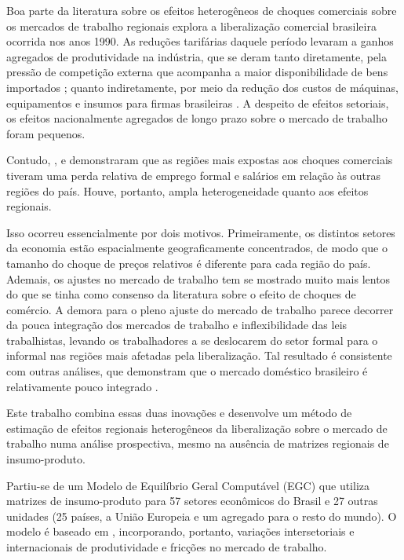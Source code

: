\documentclass{article}
\begin{document}
Boa parte da literatura sobre os efeitos heterogêneos de choques comerciais sobre os mercados de trabalho regionais explora a liberalização comercial brasileira ocorrida nos anos 1990. As reduções tarifárias daquele período levaram a ganhos agregados de produtividade na indústria, que se deram tanto diretamente, pela pressão de competição externa que acompanha a maior disponibilidade de bens importados \parencite{rossi}; quanto indiretamente, por meio da redução dos custos de máquinas, equipamentos e insumos para firmas brasileiras \parencite{lisboa}. A despeito de efeitos setoriais, os efeitos nacionalmente agregados de longo prazo sobre o mercado de trabalho foram pequenos. 

Contudo, \textcite{dixcarneiro}, \textcite{dixkovak} e  \textcite{kovak}  demonstraram que as regiões mais expostas aos choques comerciais tiveram uma perda relativa de emprego formal e salários em relação às outras regiões do país. Houve, portanto, ampla heterogeneidade quanto aos efeitos regionais.

Isso ocorreu essencialmente por dois motivos. Primeiramente, os distintos setores da economia estão espacialmente geograficamente concentrados, de modo que o tamanho do choque de preços relativos é diferente para cada região do país. Ademais, os ajustes no mercado de trabalho tem se mostrado muito mais lentos do que se tinha como consenso da literatura sobre o efeito de choques de comércio. A demora para o pleno ajuste do mercado de trabalho parece decorrer da pouca integração dos mercados de trabalho e inflexibilidade das leis trabalhistas, levando os trabalhadores a se deslocarem do setor formal para o informal nas regiões mais afetadas pela liberalização. Tal resultado é consistente com outras análises, que demonstram que o mercado doméstico brasileiro é relativamente pouco integrado \parencite{goes}.

Este trabalho combina essas duas inovações e desenvolve um método de estimação de efeitos regionais heterogêneos da liberalização sobre o mercado de trabalho numa análise prospectiva, mesmo na ausência de matrizes regionais de insumo-produto.

Partiu-se de um Modelo de Equilíbrio Geral Computável (EGC) que utiliza matrizes de insumo-produto para 57 setores econômicos do Brasil e 27 outras unidades (25 países, a União Europeia e um agregado para o resto do mundo). O modelo é baseado em \textcite{caliendo}, incorporando, portanto, variações intersetoriais e internacionais de produtividade e fricções no mercado de trabalho.
\end{document}
